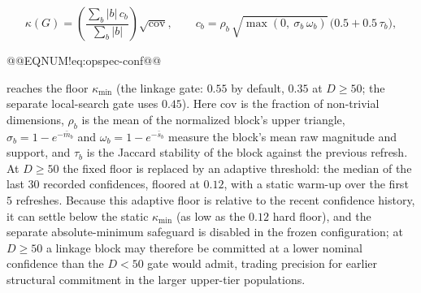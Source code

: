 \documentclass[10pt,a4paper]{article}
\begin{document}
\[
\kappa(G) = \left(\frac{\sum_b \lvert b\rvert\,c_b}{\sum_b \lvert b\rvert}\right)
\sqrt{\mathrm{cov}},
\qquad
c_b = \rho_b\,\sqrt{\max\!\left(0,\ \sigma_b\,\omega_b\right)}\,
\bigl(0.5 + 0.5\,\tau_b\bigr),
\]

@@EQNUM!eq:opspec-conf@@

reaches the floor $\kappa_{\min}$ (the linkage gate: $0.55$ by default,
$0.35$ at $D\ge 50$; the separate local-search gate uses $0.45$).
Here $\mathrm{cov}$ is the fraction of non-trivial dimensions, $\rho_b$ is the
mean of the normalized block's upper triangle, $\sigma_b=1-e^{-\bar m_b}$ and
$\omega_b=1-e^{-\bar s_b}$ measure the block's mean raw magnitude and support,
and $\tau_b$ is the Jaccard stability of the block against the previous refresh.
At $D\ge 50$ the fixed floor is replaced by an adaptive threshold: the median of
the last $30$ recorded confidences, floored at $0.12$, with a static warm-up
over the first $5$ refreshes.  Because this adaptive floor is relative to the
recent confidence history, it can settle below the static $\kappa_{\min}$ (as
low as the $0.12$ hard floor), and the separate absolute-minimum safeguard is
disabled in the frozen configuration; at $D\ge 50$ a linkage block may therefore
be committed at a lower nominal confidence than the $D<50$ gate would admit,
trading precision for earlier structural commitment in the larger upper-tier
populations.
\end{document}
